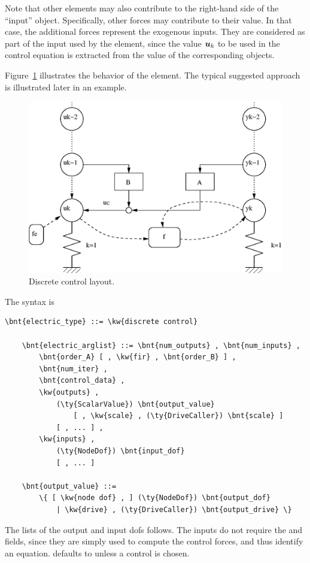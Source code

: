Note that other elements may also contribute to the right-hand side
of the ``input''  object.
Specifically, other  forces may contribute to their value.
In that case, the additional forces represent the exogenous inputs.
They are considered as part of the input used by the 
element, since the value $\boldsymbol{u}_k$ to be used in the control equation
is extracted from the value of the corresponding  objects.

Figure~\ref{fig:discctrl} illustrates the behavior of the element.
The typical suggested approach is illustrated later in an example.
\begin{figure}
\centering
{}
\includegraphics[width=.7\textwidth]{discctrl}
\caption{Discrete control layout.}
\label{fig:discctrl}
\end{figure}

The syntax is
\begin{Verbatim}[commandchars=\\\{\}]
    \bnt{electric_type} ::= \kw{discrete control}

    \bnt{electric_arglist} ::= \bnt{num_outputs} , \bnt{num_inputs} ,
        \bnt{order_A} [ , \kw{fir} , \bnt{order_B} ] ,
        \bnt{num_iter} ,
        \bnt{control_data} , 
        \kw{outputs} ,
            (\ty{ScalarValue}) \bnt{output_value}
                [ , \kw{scale} , (\ty{DriveCaller}) \bnt{scale} ]
            [ , ... ] ,
        \kw{inputs} ,
            (\ty{NodeDof}) \bnt{input_dof}
            [ , ... ]

    \bnt{output_value} ::=
        \{ [ \kw{node dof} , ] (\ty{NodeDof}) \bnt{output_dof}
            | \kw{drive} , (\ty{DriveCaller}) \bnt{output_drive} \}
\end{Verbatim}
The lists of the output and input dofs follows. The inputs
do not require the  and  fields,
since they are simply used to compute the control forces,
and thus identify an equation.
 defaults to  unless a  control is chosen.

